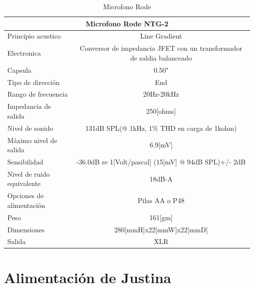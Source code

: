 \documentclass[a4paper]{book}
\begin{document}
\begin{minipage}{1\textwidth}
\begin{flushleft} %
\begin{table}[H]

\begin{tabular}{|l|l|}%

\hline
\multicolumn{2}{|c|}{Microfono Rode NTG-2} \\ \hline %
Principio acustico &  \multicolumn{1}{|c|}{Line Gradient}\\ \hline
Electronica & \multicolumn{1}{|c|}{Conversor de impedancia JFET con un transformador de saldia balanceado}\\ \hline
Capsula & \multicolumn{1}{|c|}{0.50"}\\ \hline
Tipo de dirección & \multicolumn{1}{|c|}{End}\\ \hline
Rango de frecuencia & \multicolumn{1}{|c|}{20Hz-20kHz}\\ \hline
Impedancia de salida & \multicolumn{1}{|c|}{250[ohms]}\\ \hline
Nivel de sonido & \multicolumn{1}{|c|}{131dB SPL(@ 1kHz, 1\% THD en carga de 1kohm)}\\ \hline
Máximo nivel de salida & \multicolumn{1}{|c|}{6.9[mV]}\\ \hline
Sensibilidad & \multicolumn{1}{|c|}{-36.0dB re 1[Volt/pascal] (15[mV] @ 94dB SPL)+/- 2dB}\\ \hline
Nivel de ruido equivalente & \multicolumn{1}{|c|}{18dB-A}\\ \hline
Opciones de alimentación & \multicolumn{1}{|c|}{Pilas AA o P48}\\ \hline
Peso & \multicolumn{1}{|c|}{161[gm]}\\ \hline
Dimensiones & \multicolumn{1}{|c|}{280[mmH]x22[mmW]x22[mmD]}\\ \hline
Salida & \multicolumn{1}{|c|}{XLR}\\ \hline


\end{tabular}
\caption{Microfono Rode}
\label{Microfono Rode}

\end{table}

\end{flushleft}
\end{minipage}
\vfill

\section{Alimentación de Justina}
\end{document}
